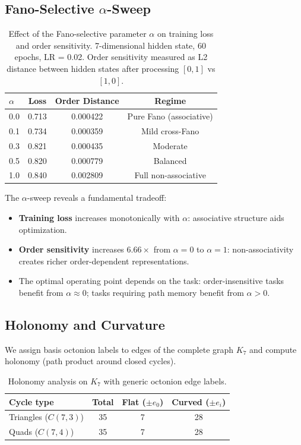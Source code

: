 \documentclass{article}
\begin{document}
\subsection{Fano-Selective $\alpha$-Sweep}

\begin{table}[h]
\centering
\caption{Effect of the Fano-selective parameter $\alpha$ on training loss and order sensitivity. 7-dimensional hidden state, 60 epochs, LR = 0.02. Order sensitivity measured as L2 distance between hidden states after processing $[0,1]$ vs $[1,0]$.}
\label{tab:alpha}
\begin{tabular}{@{}lccc@{}}
\toprule
$\alpha$ & \textbf{Loss} & \textbf{Order Distance} & \textbf{Regime} \\
\midrule
0.0 & 0.713 & 0.000422 & Pure Fano (associative) \\
0.1 & 0.734 & 0.000359 & Mild cross-Fano \\
0.3 & 0.821 & 0.000435 & Moderate \\
0.5 & 0.820 & 0.000779 & Balanced \\
1.0 & 0.840 & 0.002809 & Full non-associative \\
\bottomrule
\end{tabular}
\end{table}

The $\alpha$-sweep reveals a fundamental tradeoff:
\begin{itemize}
    \item \textbf{Training loss} increases monotonically with $\alpha$: associative structure aids optimization.
    \item \textbf{Order sensitivity} increases $6.66\times$ from $\alpha=0$ to $\alpha=1$: non-associativity creates richer order-dependent representations.
    \item The optimal operating point depends on the task: order-insensitive tasks benefit from $\alpha \approx 0$; tasks requiring path memory benefit from $\alpha > 0$.
\end{itemize}

\subsection{Holonomy and Curvature}

We assign basis octonion labels to edges of the complete graph $K_7$ and compute holonomy (path product around closed cycles).

\begin{table}[h]
\centering
\caption{Holonomy analysis on $K_7$ with generic octonion edge labels.}
\label{tab:holonomy}
\begin{tabular}{@{}lccc@{}}
\toprule
\textbf{Cycle type} & \textbf{Total} & \textbf{Flat ($\pm e_0$)} & \textbf{Curved ($\pm e_i$)} \\
\midrule
Triangles ($C(7,3)$) & 35 & 7 & 28 \\
Quads ($C(7,4)$) & 35 & 7 & 28 \\
\bottomrule
\end{tabular}
\end{table}
\end{document}
